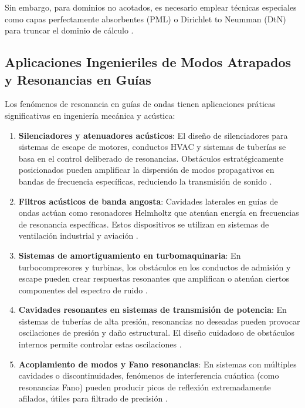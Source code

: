 \documentclass[11pt]{article}
\begin{document}
Sin embargo, para dominios no acotados, es necesario emplear técnicas especiales como capas perfectamente absorbentes (PML) o Dirichlet to Neumman (DtN) para truncar el dominio de cálculo \cite{Bao2021, Casenavea2014}.

\subsection{Aplicaciones Ingenieriles de Modos Atrapados y Resonancias en Guías}

Los fenómenos de resonancia en guías de ondas tienen aplicaciones práticas significativas en ingeniería mecánica y acústica:

\begin{enumerate}
\item \textbf{Silenciadores y atenuadores acústicos}: El diseño de silenciadores para sistemas de escape de motores, conductos HVAC y sistemas de tuberías se basa en el control deliberado de resonancias. Obstáculos estratégicamente posicionados pueden amplificar la dispersión de modos propagativos en bandas de frecuencia específicas, reduciendo la transmisión de sonido \cite{Kirby2005}.

\item \textbf{Filtros acústicos de banda angosta}: Cavidades laterales en guías de ondas actúan como resonadores Helmholtz que atenúan energía en frecuencias de resonancia específicas. Estos dispositivos se utilizan en sistemas de ventilación industrial y aviación \cite{Alkuhayli2025}.

\item \textbf{Sistemas de amortiguamiento en turbomaquinaria}: En turbocompresores y turbinas, los obstáculos en los conductos de admisión y escape pueden crear respuestas resonantes que amplifican o atenúan ciertos componentes del espectro de ruido \cite{Rämmal2009}.

\item \textbf{Cavidades resonantes en sistemas de transmisión de potencia}: En sistemas de tuberías de alta presión, resonancias no deseadas pueden provocar oscilaciones de presión y daño estructural. El diseño cuidadoso de obstáculos internos permite controlar estas oscilaciones \cite{Hein2012}.

\item \textbf{Acoplamiento de modos y Fano resonancias}: En sistemas con múltiples cavidades o discontinuidades, fenómenos de interferencia cuántica (como resonancias Fano) pueden producir picos de reflexión extremadamente afilados, útiles para filtrado de precisión \cite{Kronowetter2023}.

\end{enumerate}
\end{document}
